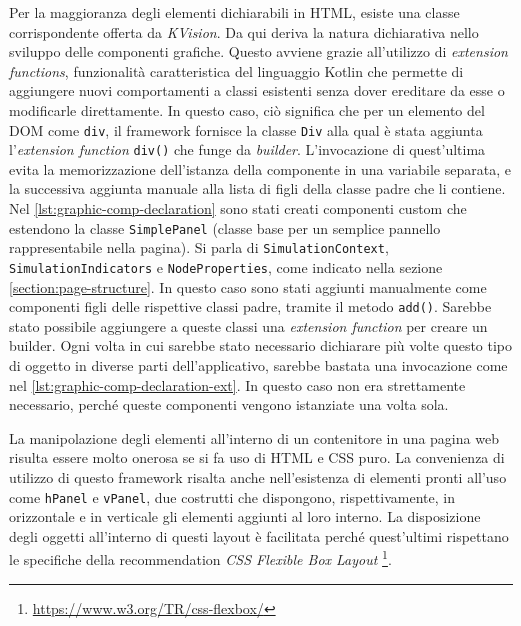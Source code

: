 Per la maggioranza degli elementi dichiarabili in HTML, esiste una classe corrispondente offerta da \textit{KVision}. Da qui deriva la natura dichiarativa nello sviluppo delle componenti grafiche. Questo avviene grazie all'utilizzo di \textit{extension functions}, funzionalità caratteristica del linguaggio Kotlin che permette di aggiungere nuovi comportamenti a classi esistenti senza dover ereditare da esse o modificarle direttamente. In questo caso, ciò significa che per un elemento del \ac{DOM} come \texttt{div}, il framework fornisce la classe \texttt{Div} alla qual è stata aggiunta l'\textit{extension function} \texttt{div()} che funge da \textit{builder}. L'invocazione di quest'ultima evita la memorizzazione dell'istanza della componente in una variabile separata, e la successiva aggiunta manuale alla lista di figli della classe padre che li contiene.
Nel \cref{lst:graphic-comp-declaration} sono stati creati componenti custom che estendono la classe \texttt{SimplePanel} (classe base per un semplice pannello rappresentabile nella pagina). Si parla di \texttt{SimulationContext}, \texttt{SimulationIndicators} e \texttt{NodeProperties}, come indicato nella sezione \ref{section:page-structure}. In questo caso sono stati aggiunti manualmente come componenti figli delle rispettive classi padre, tramite il metodo \texttt{add()}. Sarebbe stato possibile aggiungere a queste classi una \textit{extension function} per creare un builder. Ogni volta in cui sarebbe stato necessario dichiarare più volte questo tipo di oggetto in diverse parti dell'applicativo, sarebbe bastata una invocazione come nel \cref{lst:graphic-comp-declaration-ext}. In questo caso non era strettamente necessario, perché queste componenti vengono istanziate una volta sola.



La manipolazione degli elementi all'interno di un contenitore in una pagina web risulta essere molto onerosa se si fa uso di HTML e CSS puro. La convenienza di utilizzo di questo framework risalta anche nell'esistenza di elementi pronti all'uso come \texttt{hPanel} e \texttt{vPanel}, due costrutti che dispongono, rispettivamente, in orizzontale e in verticale gli elementi aggiunti al loro interno. La disposizione degli oggetti all'interno di questi layout è facilitata perché quest'ultimi rispettano le specifiche della recommendation \textit{CSS Flexible Box Layout} \footnote{\url{https://www.w3.org/TR/css-flexbox/}}.

